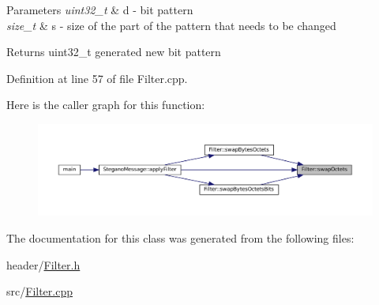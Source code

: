\begin{DoxyParams}{Parameters}
{\em uint32\+\_\+t} & d -\/ bit pattern \\
\hline
{\em size\+\_\+t} & s -\/ size of the part of the pattern that needs to be changed \\
\hline
\end{DoxyParams}
\begin{DoxyReturn}{Returns}
uint32\+\_\+t generated new bit pattern 
\end{DoxyReturn}


Definition at line 57 of file Filter.\+cpp.

Here is the caller graph for this function\+:\nopagebreak
\begin{figure}[H]
\begin{center}
\leavevmode
\includegraphics[width=350pt]{classFilter_aeb85c27a3d80540f2bd4b5f314543d4c_icgraph}
\end{center}
\end{figure}


The documentation for this class was generated from the following files\+:\begin{DoxyCompactItemize}
\item 
header/\mbox{\hyperlink{Filter_8h}{Filter.\+h}}\item 
src/\mbox{\hyperlink{Filter_8cpp}{Filter.\+cpp}}\end{DoxyCompactItemize}
